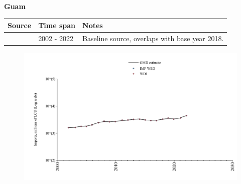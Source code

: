 \documentclass[12pt,a4paper,landscape]{article}
\begin{document}
\begin{adjustbox}{max totalsize={\paperwidth}{\paperheight},center}
\begin{minipage}[t][\textheight][t]{\textwidth}
\vspace*{0.5cm}
{}
\begin{center}
{\Large\bfseries Guam}
\end{center}
\vspace{0.5cm}
\begin{table}[H]
\centering
\small
\begin{tabular}{|l|l|l|}
\hline
\textbf{Source} & \textbf{Time span} & \textbf{Notes} \\
\hline
\rowcolor{white}\cite{WDI}& 2002 - 2022 &Baseline source, overlaps with base year 2018.\\
\hline
\end{tabular}
\end{table}
\begin{figure}[H]
\centering
\includegraphics[width=\textwidth,height=0.6\textheight,keepaspectratio]{graphs/GUM_imports.pdf}
\end{figure}
\end{minipage}
\end{adjustbox}
\end{document}
